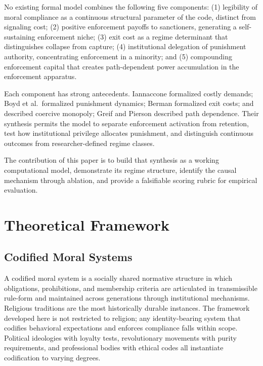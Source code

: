 \documentclass[12pt]{article}
\begin{document}
No existing formal model combines the following five components: (1) legibility of moral compliance as a continuous structural parameter of the code, distinct from signaling cost; (2) positive enforcement payoffs to sanctioners, generating a self-sustaining enforcement niche; (3) exit cost as a regime determinant that distinguishes collapse from capture; (4) institutional delegation of punishment authority, concentrating enforcement in a minority; and (5) compounding enforcement capital that creates path-dependent power accumulation in the enforcement apparatus.

Each component has strong antecedents. Iannaccone formalized costly demands; Boyd et al.\ formalized punishment dynamics; Berman formalized exit costs; \citet{weber1946} and \citet{tilly1985} described coercive monopoly; Greif and Pierson described path dependence. Their synthesis permits the model to separate enforcement activation from retention, test how institutional privilege allocates punishment, and distinguish continuous outcomes from researcher-defined regime classes.

The contribution of this paper is to build that synthesis as a working computational model, demonstrate its regime structure, identify the causal mechanism through ablation, and provide a falsifiable scoring rubric for empirical evaluation.



\section{Theoretical Framework}

\subsection{Codified Moral Systems}

A codified moral system is a socially shared normative structure in which obligations, prohibitions, and membership criteria are articulated in transmissible rule-form and maintained across generations through institutional mechanisms. Religious traditions are the most historically durable instances. The framework developed here is not restricted to religion; any identity-bearing system that codifies behavioral expectations and enforces compliance falls within scope. Political ideologies with loyalty tests, revolutionary movements with purity requirements, and professional bodies with ethical codes all instantiate codification to varying degrees.
\end{document}
